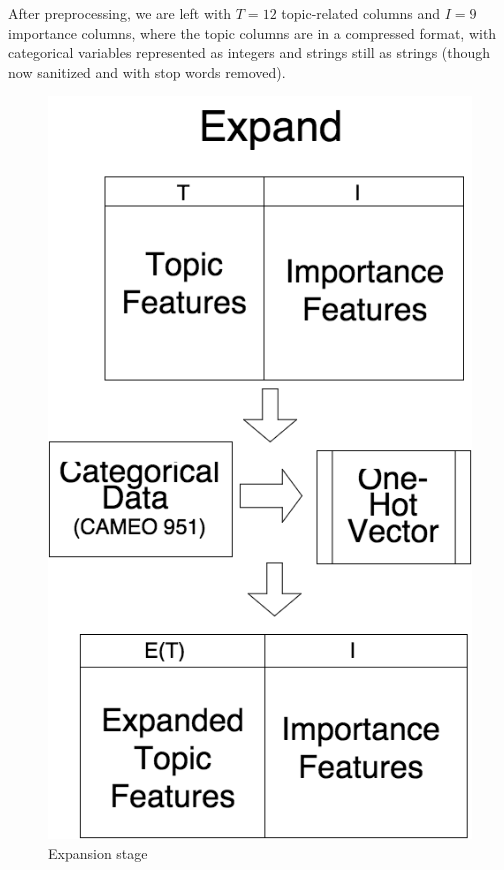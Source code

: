 After preprocessing, we are left with $T=12$ topic-related columns and $I=9$ importance columns, where the topic columns are in a compressed format, with categorical variables represented as integers and strings still as strings (though now sanitized and with stop words removed).

\begin{figure}[ht]
\vskip 0.2in
\begin{center}
\centerline{\includegraphics[scale=0.15]{images/expand_vertical.png}}
\caption{Expansion stage}
\end{center}
\vskip -0.2in
\label{fig:exapand}
\end{figure}

